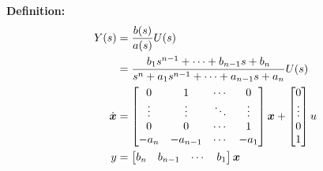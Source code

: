 \textbf{Definition:}
    \begin{align}
        Y(s) &= \frac{b(s)}{a(s)} U(s) \\ & = \frac{b_1s^{n-1}+\cdots+b_{n-1}s+b_n}{s^n+a_1s^{n-1}+\cdots + a_{n-1}s+a_n} U(s)\label{eq:uebertragung}\\
        \dot{\boldsymbol{x}} &= 
        \begin{bmatrix}
            0 & 1 & \cdots & 0\\
            \vdots & \vdots & \ddots & \vdots \\
            0&0&\cdots&1\\
            -a_n&-a_{n-1}&\cdots&-a_1
        \end{bmatrix}\boldsymbol{x}+ 
        \begin{bmatrix}
            0 \\ \vdots \\0\\1
        \end{bmatrix} u \\
        y&= \begin{bmatrix}
            b_n & b_{n-1} & \cdots & b_1
        \end{bmatrix} \boldsymbol{x}
    \end{align}

